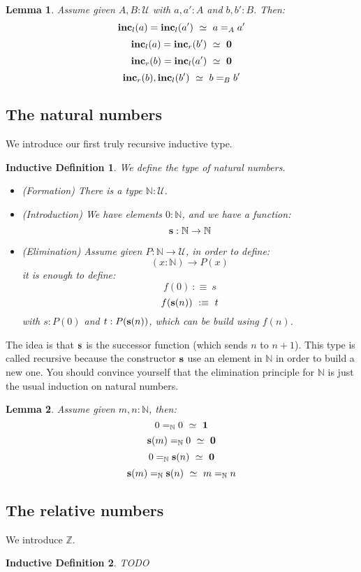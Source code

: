 \documentclass{article}
\newcommand{\sse}[1]{\medbreak \subsection{#1}}
\newcommand{\U}{{\mathcal U}}
\renewcommand{\r}{\rightarrow}
\newcommand{\one}{{\bf 1}}
\newcommand{\zero}{{\bf 0}}
\newcommand{\s}{\mathrm{\bf s}}
\newcommand{\inc}{\mathrm{\bf inc}}
\newtheorem{lemma}{Lemma}
\newtheorem{ind_def}{Inductive Definition}
\begin{document}

\begin{lemma}
Assume given $A,B:\U$ with $a,a':A$ and $b,b':B$. Then:
\[\inc_l(a) = \inc_l(a') \ \simeq \ a=_Aa'\]
\[\inc_l(a) = \inc_r(b')\ \simeq \ \zero\]
\[\inc_r(b) = \inc_l(a') \ \simeq \ \zero\]
\[\inc_r(b),\inc_l(b') \ \simeq \ b=_Bb'\]
\end{lemma}


\sse{The natural numbers}

We introduce our first truly recursive inductive type.

\begin{ind_def}
We define the type of natural numbers.
\begin{itemize}
\item (Formation) There is a type $\mathbb{N}:\U$.
\item (Introduction) We have elements $0:\mathbb{N}$, and we have a function:
\[\s : \mathbb{N} \r \mathbb{N}\]
\item (Elimination) Assume given $P:\mathbb{N}\r \U$, in order to define:
\[(x:\mathbb{N})\r P(x)\]
it is enough to define:
\[f(0) \ :\equiv\ s\]
\[f(\s(n)) \ :\equiv\ t\]
with $s:P(0)$ and $t:P(\s(n))$, which can be build using $f(n)$.
\end{itemize}
\end{ind_def}

The idea is that $\s$ is the successor function (which sends $n$ to $n+1$). This type is called recursive because the constructor $\s$ use an element in $\mathbb{N}$ in order to build a new one. You should convince yourself that the elimination principle for $\mathbb{N}$ is just the usual induction on natural numbers.

\begin{lemma}
Assume given $m,n:\mathbb{N}$, then:
\[0=_\mathbb{N}0\ \simeq\ \one\]
\[\s(m)=_\mathbb{N}0\ \simeq\ \zero\]
\[0=_\mathbb{N}\s(n)\ \simeq\ \zero\]
\[\s(m)=_\mathbb{N}\s(n)\ \simeq\ m=_\mathbb{N}n\]
\end{lemma}


\sse{The relative numbers}

We introduce $\mathbb{Z}$.

\begin{ind_def}
TODO
\end{ind_def}
\end{document}

